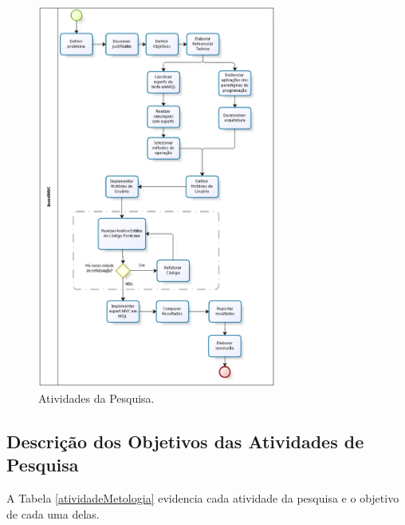 \begin{figure}[H]
\centering
\includegraphics[width=0.7\textwidth]{figuras/metodologiaTCC}
\caption{Atividades da Pesquisa.} 
\label{metodologia}
\end{figure}

\subsection{Descrição dos Objetivos das Atividades de Pesquisa}

A Tabela \ref{atividadeMetologia} evidencia cada atividade da pesquisa e o objetivo de cada uma delas.

